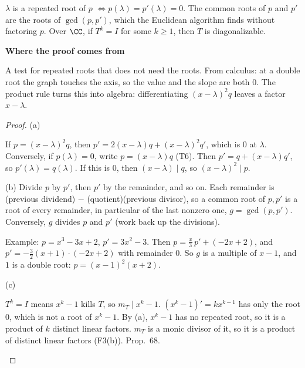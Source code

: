 \documentclass[10pt]{scrartcl}
\newenvironment{motive}{\begin{mdframed}[style=thinkbox]\textbf{\color{OliveGreen!75!black}Where the proof comes from}\begin{description}[leftmargin=0.9em,labelindent=0pt,itemsep=2pt,topsep=2pt,font=\normalfont\bfseries\color{OliveGreen!70!black}]}{\end{description}\end{mdframed}}
\newenvironment{steps}{\begin{enumerate}[label=\arabic*.,leftmargin=1.5em,itemsep=2pt,topsep=2pt]}{\end{enumerate}}
\begin{document}
\begin{proposition*}
  \begin{enumerate}[(a)]
    \ii $\lambda$ is a repeated root of $p$ $\iff p(\lambda)=p'(\lambda)=0$.
    \ii The common roots of $p$ and $p'$ are the roots of $\gcd(p,p')$, which the Euclidean algorithm finds without factoring $p$.
    \ii Over $\CC$, if $T^k=I$ for some $k\ge1$, then $T$ is diagonalizable.
  \end{enumerate}
\end{proposition*}
\begin{motive}
  \ii[Want.] A test for repeated roots that does not need the roots.
  \ii[Know.] From calculus: at a double root the graph touches the axis, so the value and the slope are both $0$.
   The product rule turns this into algebra: differentiating $(x-\lambda)^2q$ leaves a factor $x-\lambda$.
\end{motive}
\begin{proof}
  (a)
  \begin{steps}
    \ii If $p=(x-\lambda)^2q$, then $p'=2(x-\lambda)q+(x-\lambda)^2q'$, which is $0$ at $\lambda$.
    \ii Conversely, if $p(\lambda)=0$, write $p=(x-\lambda)q$ (T6). Then $p'=q+(x-\lambda)q'$, so $p'(\lambda)=q(\lambda)$. If this is $0$, then $(x-\lambda)\mid q$, so $(x-\lambda)^2\mid p$.
  \end{steps}
  (b) Divide $p$ by $p'$, then $p'$ by the remainder, and so on. Each remainder is (previous dividend) $-$ (quotient)(previous divisor), so a common root of $p,p'$ is a root of every remainder, in particular of the last nonzero one, $g=\gcd(p,p')$. Conversely, $g$ divides $p$ and $p'$ (work back up the divisions).

  Example: $p=x^3-3x+2$, $p'=3x^2-3$. Then $p=\frac x3\,p'+(-2x+2)$, and $p'=-\frac32(x+1)\cdot(-2x+2)$ with remainder $0$. So $g$ is a multiple of $x-1$, and $1$ is a double root: $p=(x-1)^2(x+2)$.

  (c)
  \begin{steps}
    \ii $T^k=I$ means $x^k-1$ kills $T$, so $m_T\mid x^k-1$.
    \ii $(x^k-1)'=kx^{k-1}$ has only the root $0$, which is not a root of $x^k-1$. By (a), $x^k-1$ has no repeated root, so it is a product of $k$ distinct linear factors.
    \ii $m_T$ is a monic divisor of it, so it is a product of distinct linear factors (F3(b)). Prop.~68.
  \end{steps}
\end{proof}
\end{document}
